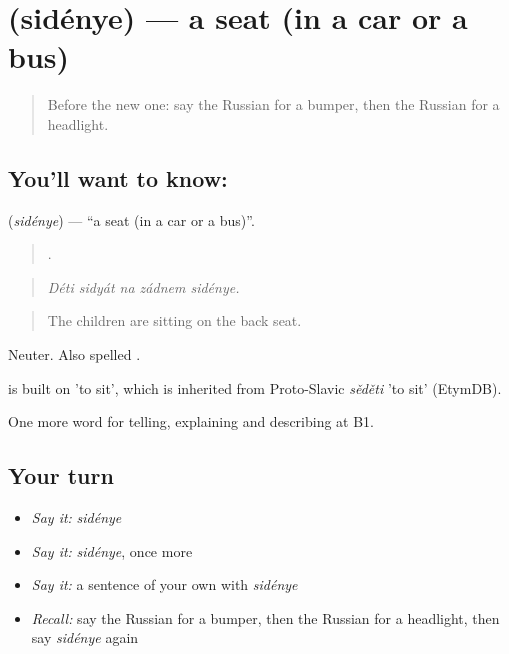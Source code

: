 \section[\texorpdfstring{\ru{сиденье} (sidénye)}{сиденье (sidénye)}]{ (sidénye) — a seat (in a car or a bus)}

\label{lesson:RU-C406-sidenye}



\begin{quote}
Before the new one: say the Russian for a bumper, then the Russian for a headlight.
\end{quote}

\subsection*{You'll want to know: }
\textbf{} (\emph{sidénye}) — \textquotedblleft{}a seat (in a car or a bus)\textquotedblright{}.

\begin{quote}
    .
\end{quote}

\begin{quote}
\emph{Déti sidyát na zádnem sidénye.}
\end{quote}

\begin{quote}
The children are sitting on the back seat.
\end{quote}

Neuter. Also spelled \emph{}.

\begin{cousinweb}
\emph{} is built on \emph{} 'to sit', which is inherited from Proto-Slavic \emph{sěděti} 'to sit' (EtymDB).
\end{cousinweb}

\begin{grammarlens}[title={What you've built}]
One more word for telling, explaining and describing at B1.
\end{grammarlens}

\subsection*{Your turn}
\begin{itemize}
\raggedright
  \item \emph{Say it:} \emph{sidénye}
  \item \emph{Say it:} \emph{sidénye}, once more
  \item \emph{Say it:} a sentence of your own with \emph{sidénye}
  \item \emph{Recall:} say the Russian for a bumper, then the Russian for a headlight, then say \emph{sidénye} again
\end{itemize}


